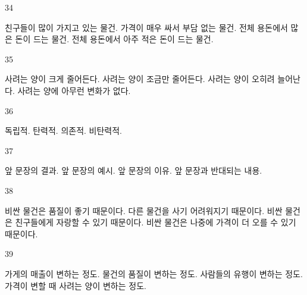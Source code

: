 \documentclass[fs9,seriesFre]{korfarm-base}
\begin{document}
\begin{kfSentenceUnit}{34}{}
\begin{kfChoices}
\kfChoice 친구들이 많이 가지고 있는 물건.
\kfChoice 가격이 매우 싸서 부담 없는 물건.
\kfChoice 전체 용돈에서 많은 돈이 드는 물건.
\kfChoice 전체 용돈에서 아주 적은 돈이 드는 물건.
\end{kfChoices}
\end{kfSentenceUnit}

\begin{kfSentenceUnit}{35}{}
\begin{kfChoices}
\kfChoice 사려는 양이 크게 줄어든다.
\kfChoice 사려는 양이 조금만 줄어든다.
\kfChoice 사려는 양이 오히려 늘어난다.
\kfChoice 사려는 양에 아무런 변화가 없다.
\end{kfChoices}
\end{kfSentenceUnit}

\begin{kfSentenceUnit}{36}{}
\begin{kfChoices}
\kfChoice 독립적.
\kfChoice 탄력적.
\kfChoice 의존적.
\kfChoice 비탄력적.
\end{kfChoices}
\end{kfSentenceUnit}

\begin{kfSentenceUnit}{37}{}
\begin{kfChoices}
\kfChoice 앞 문장의 결과.
\kfChoice 앞 문장의 예시.
\kfChoice 앞 문장의 이유.
\kfChoice 앞 문장과 반대되는 내용.
\end{kfChoices}
\end{kfSentenceUnit}

\begin{kfSentenceUnit}{38}{}
\begin{kfChoices}
\kfChoice 비싼 물건은 품질이 좋기 때문이다.
\kfChoice 다른 물건을 사기 어려워지기 때문이다.
\kfChoice 비싼 물건은 친구들에게 자랑할 수 있기 때문이다.
\kfChoice 비싼 물건은 나중에 가격이 더 오를 수 있기 때문이다.
\end{kfChoices}
\end{kfSentenceUnit}

\begin{kfSentenceUnit}{39}{}
\begin{kfChoices}
\kfChoice 가게의 매출이 변하는 정도.
\kfChoice 물건의 품질이 변하는 정도.
\kfChoice 사람들의 유행이 변하는 정도.
\kfChoice 가격이 변할 때 사려는 양이 변하는 정도.
\end{kfChoices}
\end{kfSentenceUnit}
\end{document}
